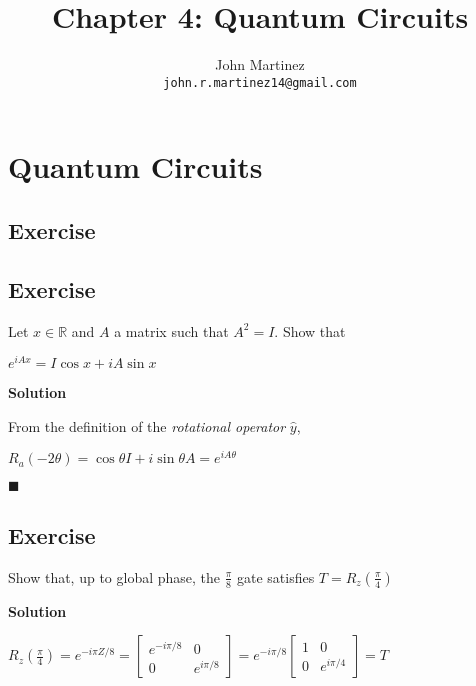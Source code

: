 \documentclass{article}
\title{Chapter 4: Quantum Circuits}
\author{
  John Martinez \\
  \texttt{john.r.martinez14@gmail.com} \\
}
\begin{document}
\maketitle


\section{Quantum Circuits}

\subsection{Exercise}

\subsection{Exercise}
Let $x \in \mathbb{R}$ and $A$ a matrix such that $A^{2} = I$. Show that
\begin{center}
  $e^{iAx} = I\cos{x} + i A\sin{x}$
\end{center}

\textbf{Solution}

From the definition of the \emph{rotational operator} $\hat{y}$,

\begin{center}
  $R_a(-2\theta) = \cos{\theta}I + i\sin{\theta}A = e^{iA\theta}$
\end{center}
$\blacksquare$

\subsection{Exercise}
Show that, up to global phase, the $\frac{\pi}{8}$
gate satisfies $T = R_{z}(\frac{\pi}{4})$

\textbf{Solution}

$
  R_{z}(\frac{\pi}{4}) = e^{-i \pi Z / 8} = 
  \begin{bmatrix}
    e^{-i \pi / 8} & 0 \\
    0 & e^{i \pi / 8}
  \end{bmatrix} = 
  e^{-i \pi / 8}\begin{bmatrix}
    1 & 0 \\
    0 & e^{i \pi / 4}
  \end{bmatrix} = T$
\end{document}
